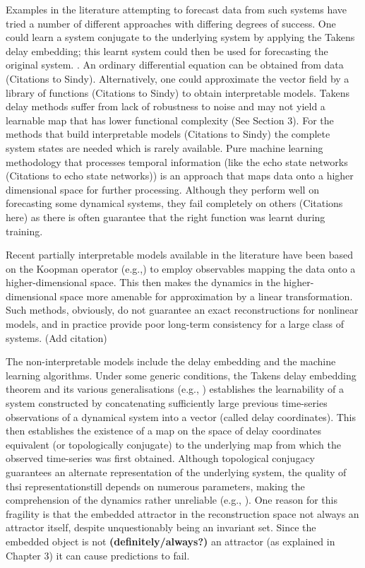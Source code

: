 \documentclass[12 pt]{article}
\begin{document}
Examples in the literature attempting to forecast data from such systems have tried a number of different approaches with differing degrees of success. One could learn a system conjugate to the underlying system by applying the Takens delay embedding; this learnt system could then be used for forecasting the original system. \cite{takens1981detecting}. An ordinary differential equation can be obtained from data (Citations to Sindy). Alternatively, one could approximate the vector field by a library of functions (Citations to Sindy) to obtain interpretable models. Takens delay methods suffer from lack of robustness to noise and may not yield a learnable map that has lower functional complexity (See Section 3). For the methods that build interpretable models (Citations to Sindy) the complete system states are needed which is rarely available. Pure machine learning methodology that processes temporal information (like the echo state networks (Citations to echo state networks)) is an approach that maps data onto a higher dimensional space for further processing. Although they perform  well on forecasting some dynamical systems, they fail completely on others (Citations here) as there is often guarantee that the right function was learnt during training.

Recent partially interpretable models available in the literature have been based on the Koopman operator (e.g.,\cite{koopman1932dynamical,budivsic2012applied}) to  employ observables mapping the data onto a higher-dimensional space. This then makes the dynamics in the higher-dimensional space more amenable for approximation by a linear transformation. Such methods, obviously, do not guarantee an exact reconstructions for nonlinear models, and in practice provide poor long-term consistency for a large class of systems. (Add citation)

The non-interpretable models include the delay embedding and the machine learning algorithms. Under some generic conditions, the Takens delay embedding theorem \cite{takens1981detecting} and its various generalisations (e.g., \cite{sauer1991embedology, stark1999delay, gutman2018embedding, gutman2018embedding}) establishes the learnability of a system constructed by concatenating sufficiently large previous time-series observations of a dynamical system into a vector (called delay coordinates). This then establishes the existence of a map on the space of delay coordinates equivalent (or topologically conjugate) to the underlying map from which the observed time-series was first obtained. Although topological conjugacy guarantees an alternate representation of the underlying system, the quality of thsi representationstill depends on numerous parameters, making the comprehension of the dynamics rather unreliable (e.g., \cite{principe1992prediction}). One reason for this fragility is that the embedded attractor in the reconstruction space not always an attractor itself, despite  unquestionably being an invariant set. Since the embedded object is not \textbf{(definitely/always?)} an attractor (as explained in Chapter 3) it can cause predictions to fail.
\end{document}
